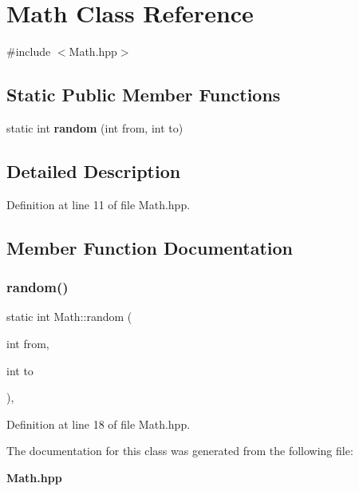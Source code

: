 \section{Math Class Reference}
\label{class_math}


{\ttfamily \#include $<$Math.\+hpp$>$}

\subsection*{Static Public Member Functions}
\begin{DoxyCompactItemize}
\item 
static int \textbf{ random} (int from, int to)
\end{DoxyCompactItemize}


\subsection{Detailed Description}


Definition at line 11 of file Math.\+hpp.



\subsection{Member Function Documentation}
\mbox{\label{class_math_a8c99abf983c23215d0d1bb26e3b50023}} 
\subsubsection{random()}
{\footnotesize\ttfamily static int Math\+::random (\begin{DoxyParamCaption}\item[{int}]{from,  }\item[{int}]{to }\end{DoxyParamCaption})\hspace{0.3cm}{\ttfamily [inline]}, {\ttfamily [static]}}



Definition at line 18 of file Math.\+hpp.



The documentation for this class was generated from the following file\+:\begin{DoxyCompactItemize}
\item 
\textbf{ Math.\+hpp}\end{DoxyCompactItemize}
